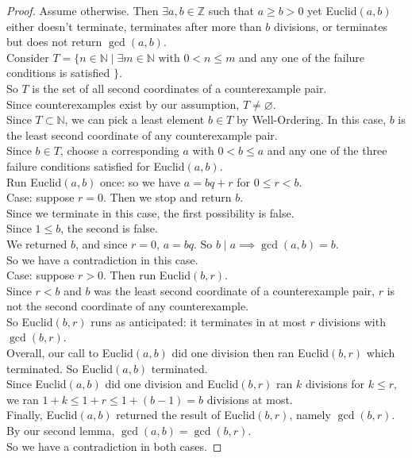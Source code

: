 \documentclass[11pt]{amsart}
\theoremstyle{definition}
\newcommand{\integers}{\mathbb{Z}}
\newcommand{\naturals}{\mathbb{N}}
\let\emptyset\varnothing
\begin{document}
\begin{proof}
	Assume otherwise. Then $\exists a, b \in \integers$ such that $a \geq b > 0$ yet Euclid$(a, b)$ either doesn't terminate, terminates after
	more than $b$ divisions, or terminates but does not return $\gcd(a, b)$. \\
	Consider $T = \{ n \in \naturals \mid \exists m \in \naturals \text{ with } 0 < n \leq m$ and any one of the failure conditions is satisfied $\}$. \\
	So $T$ is the set of all second coordinates of a counterexample pair. \\
	Since counterexamples exist by our assumption, $T \neq \emptyset$. \\
	Since $T \subset \naturals$, we can pick a least element $b \in T$ by Well-Ordering. In this case, $b$ is the least second coordinate of
	any counterexample pair. \\
	Since $b \in T$, choose a corresponding $a$ with $0 < b \leq a$ and any one of the three failure conditions satisfied for Euclid$(a, b)$. \\
	Run Euclid$(a, b)$ once: so we have $a = bq + r$ for $0 \leq r < b$. \\
	Case: suppose $r = 0$. Then we stop and return $b$. \\
	Since we terminate in this case, the first possibility is false. \\
	Since $1 \leq b$, the second is false. \\
	We returned $b$, and since $r = 0$, $a = bq$. So $b \mid a \implies \gcd(a, b) = b$. \\
	So we have a contradiction in this case. \\
	Case: suppose $r > 0$. Then run Euclid$(b, r)$. \\
	Since $r < b$ and $b$ was the least second coordinate of a counterexample pair, $r$ is not the second coordinate of any counterexample.\\
	So Euclid$(b, r)$ runs as anticipated: it terminates in at most $r$ divisions with $\gcd(b, r)$. \\
	Overall, our call to Euclid$(a, b)$ did one division then ran Euclid$(b, r)$ which terminated. So Euclid$(a, b)$ terminated. \\
	Since Euclid$(a, b)$ did one division and Euclid$(b, r)$ ran $k$ divisions for $k \leq r$, we ran $1 + k \leq 1 + r \leq 1 + (b - 1) = b$ divisions
	at most. \\
	Finally, Euclid$(a, b)$ returned the result of Euclid$(b, r)$, namely $\gcd(b, r)$. \\
	By our second lemma, $\gcd(a, b) = \gcd(b, r)$. \\
	So we have a contradiction in both cases.
\end{proof}
\end{document}
